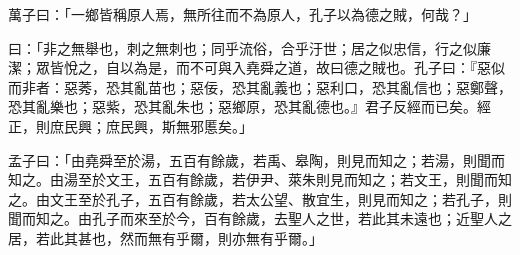 \documentclass[12pt,a4paper]{ctexbook}
\begin{document}
萬子曰：「一鄉皆稱原人焉，無所往而不為原人，孔子以為德之賊，何哉？」\par
曰：「非之無舉也，刺之無刺也；同乎流俗，合乎汙世；居之似忠信，行之似廉潔；眾皆悅之，自以為是，而不可與入堯舜之道，故曰德之賊也。孔子曰：『惡似而非者：惡莠，恐其亂苗也；惡佞，恐其亂義也；惡利口，恐其亂信也；惡鄭聲，恐其亂樂也；惡紫，恐其亂朱也；惡鄉原，恐其亂德也。』君子反經而已矣。經正，則庶民興；庶民興，斯無邪慝矣。」\par
孟子曰：「由堯舜至於湯，五百有餘歲，若禹、皋陶，則見而知之；若湯，則聞而知之。由湯至於文王，五百有餘歲，若伊尹、萊朱則見而知之；若文王，則聞而知之。由文王至於孔子，五百有餘歲，若太公望、散宜生，則見而知之；若孔子，則聞而知之。由孔子而來至於今，百有餘歲，去聖人之世，若此其未遠也；近聖人之居，若此其甚也，然而無有乎爾，則亦無有乎爾。」\par
\end{document}
